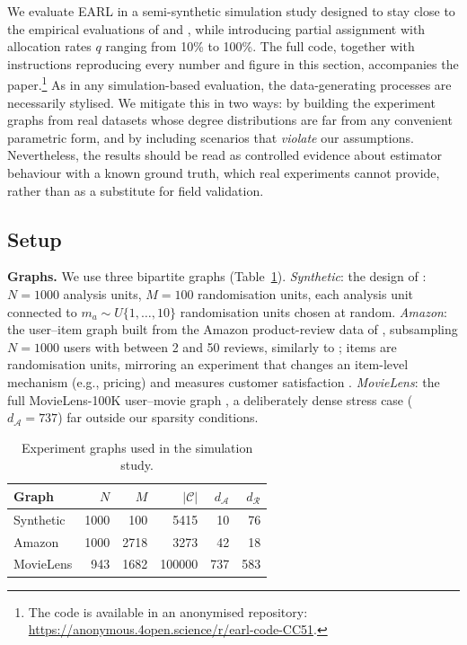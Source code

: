 \documentclass[sigconf]{acmart}
\newcounter{assumption}
\begin{document}
We evaluate EARL in a semi-synthetic simulation study designed to stay close to the empirical evaluations of \citet{doudchenko2020causal} and \citet{harshaw2023erl}, while introducing partial assignment with allocation rates $q$ ranging from 10\% to 100\%. The full code, together with instructions reproducing every number and figure in this section, accompanies the paper.\footnote{The code is available in an anonymised repository: \url{https://anonymous.4open.science/r/earl-code-CC51}.} As in any simulation-based evaluation, the data-generating processes are necessarily stylised. We mitigate this in two ways: by building the experiment graphs from real datasets whose degree distributions are far from any convenient parametric form, and by including scenarios that \emph{violate} our assumptions. Nevertheless, the results should be read as controlled evidence about estimator behaviour with a known ground truth, which real experiments cannot provide, rather than as a substitute for field validation.

\subsection{Setup}\label{subsec:sim-setup}

\textbf{Graphs.} We use three bipartite graphs (Table~\ref{tab:graphs}). \emph{Synthetic}: the design of \cite[Section~6.1]{doudchenko2020causal}: $N=1000$ analysis units, $M=100$ randomisation units, each analysis unit connected to $m_a\sim U\{1,\ldots,10\}$ randomisation units chosen at random. \emph{Amazon}: the user--item graph built from the Amazon product-review data of \citet{he2016ups,mcauley2015image}, subsampling $N=1000$ users with between 2 and 50 reviews, similarly to \cite[Section~6.2]{doudchenko2020causal}; items are randomisation units, mirroring an experiment that changes an item-level mechanism (e.g., pricing) and measures customer satisfaction \cite{harshaw2023erl}. \emph{MovieLens}: the full MovieLens-100K user--movie graph \cite{harper2015movielens}, a deliberately dense stress case ($d_{\mathcal A}=737$) far outside our sparsity conditions.

\begin{table}
\caption{Experiment graphs used in the simulation study.}
\label{tab:graphs}
\begin{tabular}{lrrrrr}
\toprule
Graph & $N$ & $M$ & $|\mathcal C|$ & $d_{\mathcal A}$ & $d_{\mathcal R}$\\
\midrule
Synthetic & 1000 & 100 & 5415 & 10 & 76\\
Amazon & 1000 & 2718 & 3273 & 42 & 18\\
MovieLens & 943 & 1682 & 100000 & 737 & 583\\
\bottomrule
\end{tabular}
\end{table}
\end{document}
